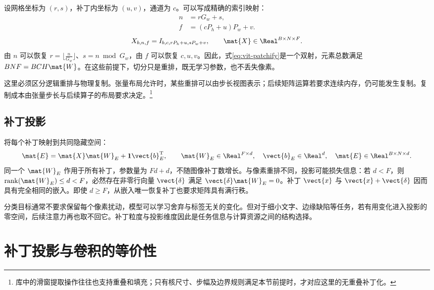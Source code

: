\documentclass[../textbook.tex]{subfiles}
\begin{document}
设网格坐标为 $(r,s)$，补丁内坐标为 $(u,v)$，通道为 $c$。可以写成精确的索引映射：
\begin{equation}\label{eq:vit-index}
 \begin{aligned}
  n&=rG_w+s,\\
  f&=(cP_h+u)P_w+v.
 \end{aligned}
\end{equation}
\begin{equation}
 X_{b,n,f}=I_{b,c,rP_h+u,sP_w+v},\qquad \mat{X}\in\Real^{B\times N\times F}.
 \label{eq:vit-patchify}
\end{equation}
由 $n$ 可以恢复 $r=\lfloor \frac{n}{G_w}\rfloor$、$s=n\bmod G_w$，由 $f$ 可以恢复 $c,u,v$。因此，式\eqref{eq:vit-patchify}是一个双射，元素总数满足 $BNF=BCH\mat{W}$。在这些前提下，切分只是重排，既无学习参数，也不丢失像素。

这里必须区分逻辑重排与物理复制。张量布局允许时，某些重排可以由步长视图表示；后续矩阵运算若要求连续内存，仍可能发生复制。复制成本由张量步长与后续算子的布局要求决定。\footnote{库中的滑窗提取操作往往也支持重叠和填充；只有核尺寸、步幅及边界规则满足本节前提时，才对应这里的无重叠补丁化。}

\subsection{补丁投影}
将每个补丁映射到共同隐藏空间：
\begin{equation}
 \mat{E}=\mat{X}\mat{W}_E+\boldsymbol 1 \vect{b}_E^{\mathrm{T}},\qquad
 \mat{W}_E\in\Real^{F\times d},\quad \vect{b}_E\in\Real^d,
 \quad \mat{E}\in\Real^{B\times N\times d}.
 \label{eq:vit-embedding}
\end{equation}
同一个 $\mat{W}_E$ 作用于所有补丁，参数量为 $Fd+d$，不随图像补丁数增长。与像素重排不同，投影可能损失信息：若 $d<F$，则 $\operatorname{rank}(\mat{W}_E)\leq d<F$，必然存在非零行向量 $\vect{\delta}$ 满足 $\vect{\delta} \mat{W}_E=0$。补丁 $\vect{x}$ 与 $\vect{x}+\vect{\delta}$ 因而具有完全相同的嵌入。即使 $d\geq F$，从嵌入唯一恢复补丁也要求矩阵具有满行秩。

分类目标通常不要求保留每个像素扰动，模型可以学习舍弃与标签无关的变化。但对于细小文字、边缘缺陷等任务，若有用变化进入投影的零空间，后续注意力再也取不回它。补丁粒度与投影维度因此是任务信息与计算资源之间的结构选择。

\section{补丁投影与卷积的等价性}
\end{document}
